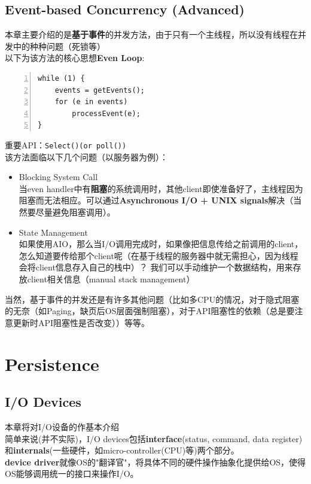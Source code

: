 \documentclass{article}
\begin{document}
\subsection{Event-based Concurrency (Advanced)}
本章主要介绍的是\textbf{基于事件}的并发方法，由于只有一个主线程，所以没有线程在并发中的种种问题（死锁等） \\
以下为该方法的核心思想\textbf{Even Loop}:
\begin{Verbatim}[numbers=left, frame=single, formatcom=\color{black}]
while (1) {
    events = getEvents(); 
    for (e in events)  
        processEvent(e);
}
\end{Verbatim}
重要API：\texttt{Select()(or poll())} \\
该方法面临以下几个问题（以服务器为例）：
\begin{itemize}
    \item Blocking System Call \\
    当even handler中有\textbf{阻塞}的系统调用时，其他client即使准备好了，主线程因为阻塞而无法相应。可以通过\textbf{Asynchronous I/O + UNIX signals}解决（当然要尽量避免阻塞调用）。
    \item State Management \\
    如果使用AIO，那么当I/O调用完成时，如果像把信息传给之前调用的client，怎么知道要传给那个client呢（在基于线程的服务器中就无需担心，因为线程会将client信息存入自己的栈中）？
    我们可以手动维护一个数据结构，用来存放client相关信息（manual stack management）
\end{itemize}
当然，基于事件的并发还是有许多其他问题（比如多CPU的情况，对于隐式阻塞的无奈（如Paging，缺页后OS层面强制阻塞），对于API阻塞性的依赖（总是要注意更新时API阻塞性是否改变））等等。
\section{Persistence}
\subsection{I/O Devices}
本章将对I/O设备的作基本介绍 \\
\indent 简单来说(并不实际)，I/O devices包括\textbf{interface}(status, command, data register)和\textbf{internals}(一些硬件，如micro-controller(CPU)等)两个部分。\\
\indent \textbf{device driver}就像OS的"翻译官"，将具体不同的硬件操作抽象化提供给OS，使得OS能够调用统一的接口来操作I/O。
\end{document}
